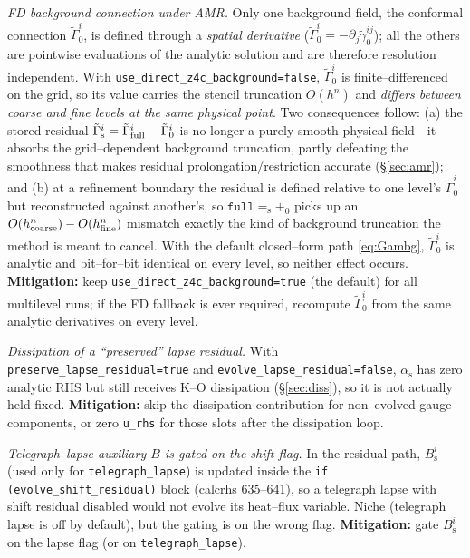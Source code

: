 \documentclass[11pt]{article}
\newcommand{\code}[1]{\texttt{#1}}
\newcommand{\gt}{\tilde\gamma}
\newcommand{\Gamt}{\tilde\Gamma}
\newcommand{\bg}[1]{#1_{0}}
\newcommand{\res}[1]{#1_{\mathrm s}}
\begin{document}
\begin{description}[leftmargin=2.2em,style=unboxed,itemsep=4pt]
\item[R3 \sev{Accuracy / Low--Medium}] \emph{FD background connection under
AMR.} Only one background field, the conformal connection $\bg{\Gamt}^i$,
is defined through a \emph{spatial derivative} ($\bg{\Gamt}^i=-\partial_j
\bg{\gt}^{ij}$); all the others are pointwise evaluations of the analytic
solution and are therefore resolution independent. With
\code{use\_direct\_z4c\_background=false}, $\bg{\Gamt}^i$ is finite--differenced
on the grid, so its value carries the stencil truncation $O(h^n)$ and
\emph{differs between coarse and fine levels at the same physical point}. Two
consequences follow: (a) the stored residual $\res{\Gamt}^i=\Gamt^i_{\rm
full}-\bg{\Gamt}^i$ is no longer a purely smooth physical field---it absorbs the
grid--dependent background truncation, partly defeating the smoothness that
makes residual prolongation/restriction accurate (\S\ref{sec:amr}); and (b) at a
refinement boundary the residual is defined relative to one level's
$\bg{\Gamt}^i$ but reconstructed against another's, so
$\code{full}=\res{}+\bg{}$ picks up an $O(h^n_{\rm coarse})-O(h^n_{\rm fine})$
mismatch exactly the kind of background truncation the method is meant to
cancel. With the default closed--form path \eqref{eq:Gambg}, $\bg{\Gamt}^i$ is
analytic and bit--for--bit identical on every level, so neither effect occurs.
\textbf{Mitigation:} keep \code{use\_direct\_z4c\_background=true} (the default)
for all multilevel runs; if the FD fallback is ever required, recompute
$\bg{\Gamt}^i$ from the same analytic derivatives on every level.

\item[R4 \sev{Bug / Low}] \emph{Dissipation of a ``preserved'' lapse residual.}
With \code{preserve\_lapse\_residual=true} and
\code{evolve\_lapse\_residual=false}, $\res\alpha$ has zero analytic RHS but
still receives K--O dissipation (\S\ref{sec:diss}), so it is not actually held
fixed. \textbf{Mitigation:} skip the dissipation contribution for non--evolved
gauge components, or zero \code{u\_rhs} for those slots after the dissipation
loop.

\item[R5 \sev{Pre--existing / Low}] \emph{Telegraph--lapse auxiliary
$B$ is gated on the shift flag.} In the residual path, $\res B^i$ (used only
for \code{telegraph\_lapse}) is updated inside the
\code{if (evolve\_shift\_residual)} block (calcrhs 635--641), so a
telegraph lapse with shift residual disabled would not evolve its heat--flux
variable. Niche (telegraph lapse is off by default), but the gating is on the
wrong flag. \textbf{Mitigation:} gate $\res B^i$ on the lapse flag (or on
\code{telegraph\_lapse}).


\end{description}
\end{document}
